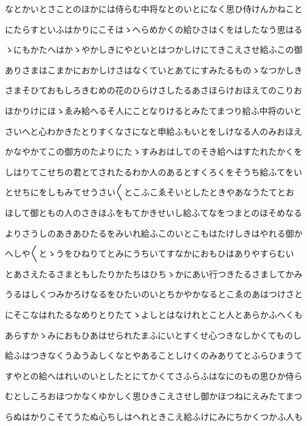 \documentclass[a4paper,11pt,landscape]{ltjtarticle}
\begin{document}
なとかいとさことのほかには侍らむ中将なとのいとになく思ひ侍けんかねこと
\par\medskip
にたらすといふはかりにこそはゝへらめかくの給ひさはくをはしたなう思はる
\par\medskip
ゝにもかたへはかゝやかしきにやといとはつかしけにてきこえさせ給ふこの御
\par\medskip
ありさまはこまかにおかしけさはなくていとあてにすみたるものゝなつかしき
\par\medskip
さまそひておもしろきむめの花のひらけさしたるあさほらけおほえてのこりお
\par\medskip
ほかりけにほゝゑみ給へるそ人にことなりけるとみたてまつり給ふ中将のいと
\par\medskip
さいへと心わかきたとりすくなさになと申給ふもいとをしけなる人のみおほえ
\par\medskip
かなやかてこの御方のたよりにたゝすみおはしてのそき給へはすたれたかくを
\par\medskip
しはりてこせちの君とてされたるわか人のあるとすくろくをそうち給ふてをい
\par\medskip
とせちにをしもみてせうさい〱とこふこゑそいとしたときやあなうたてとお
\par\medskip
ほして御ともの人のさきほふをもてかきせいし給ふてなをつまとのほそめなる
\par\medskip
よりさうしのあきあひたるをみいれ給ふこのいとこもはたけしきはやれる御か
\par\medskip
へしや〱とゝうをひねりてとみにうちいてすなかにおもひはありやすらむい
\par\medskip
とあさえたるさまともしたりかたちはひちゝかにあい行つきたるさましてかみ
\par\medskip
うるはしくつみかろけなるをひたいのいとちかやかなるとこゑのあはつけさと
\par\medskip
にそこなはれたるなめりとりたてゝよしとはなけれとこと人とあらかふへくも
\par\medskip
あらすかゝみにおもひあはせられたまふにいとすくせ心つきなしかくてものし
\par\medskip
給ふはつきなくうゐうゐしくなとやあることしけくのみありてとふらひまうて
\par\medskip
すやとの給へはれいのいとしたとにてかくてさふらふはなにのもの思ひか侍ら
\par\medskip
むとしころおほつかなくゆかしく思ひきこえさせし御かほつねにえみたてまつ
\par\medskip
らぬはかりこそてうたぬ心ちしはへれときこえ給ふけにみにちかくつかふ人も
\par\medskip
\end{document}
